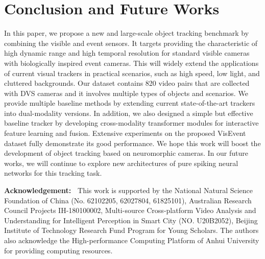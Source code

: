 \documentclass[journal]{IEEEtran}
\begin{document}
 








\section{Conclusion and Future Works}
In this paper, we propose a new and large-scale object tracking benchmark by combining the visible and event sensors. It targets providing the characteristic of high dynamic range and high temporal resolution for standard visible cameras with biologically inspired event cameras. This will widely extend the applications of current visual trackers in practical scenarios, such as high speed, low light, and cluttered backgrounds. Our dataset contains 820 video pairs that are collected with DVS cameras and it involves multiple types of objects and scenarios. We provide multiple baseline methods by extending current state-of-the-art trackers into dual-modality versions. In addition, we also designed a simple but effective baseline tracker by developing cross-modality transformer modules for interactive feature learning and fusion. Extensive experiments on the proposed VisEvent dataset fully demonstrate its good performance. We hope this work will boost the development of object tracking based on neuromorphic cameras. In our future works, we will continue to explore new architectures of pure spiking neural networks for this tracking task.




\noindent \textbf{Acknowledgement:~} This work is supported by the National Natural Science Foundation of China (No. 62102205, 62027804, 61825101), Australian Research Council Projects IH-180100002, Multi-source Cross-platform Video Analysis and Understanding for Intelligent Perception in Smart City (NO. U20B2052), Beijing Institute of Technology Research Fund Program for Young Scholars. The authors also acknowledge the High-performance Computing Platform of Anhui University for providing computing resources. 



 


{


}
\end{document}

